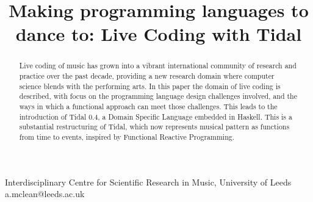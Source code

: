 \documentclass[authoryear,preprint]{sigplanconf}
\begin{document}
\setlength{\pdfpageheight}{\paperheight}
\setlength{\pdfpagewidth}{\paperwidth}



\exclusivelicense                %




\title{Making programming languages to dance to: Live Coding with Tidal}

           {Interdisciplinary Centre for Scientific Research in Music, University of Leeds}
           {a.mclean@leeds.ac.uk}

\maketitle

\begin{abstract}

Live coding of music has grown into a vibrant international community
of research and practice over the past decade, providing a new
research domain where computer science blends with the performing
arts. In this paper the domain of live coding is described, with focus
on the programming language design challenges involved, and the ways
in which a functional approach can meet those challenges. This leads
to the introduction of Tidal 0.4, a Domain Specific Language embedded
in Haskell. This is a substantial restructuring of Tidal, which now
represents musical pattern as functions from time to events, inspired
by Functional Reactive Programming.

\end{abstract}

\end{document}
